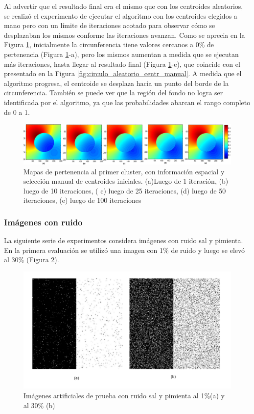 Al advertir que el resultado final era el mismo que con los centroides aleatorios,  se realizó el experimento de ejecutar el algoritmo con los centroides elegidos a mano pero con un límite de iteraciones acotado para observar cómo se desplazaban los mismos conforme las iteraciones avanzan. Como se aprecia en la Figura \ref{fig:circulo_iteraciones}, inicialmente la circunferencia tiene valores cercanos a $0\%$ de pertenencia (Figura \ref{fig:circulo_iteraciones}-a), pero los mismos aumentan a medida que se ejecutan más iteraciones, hasta llegar al resultado final (Figura \ref{fig:circulo_iteraciones}-e), que coincide con el presentado en la Figura \ref{fig:circulo_aleatorio_centr_manual}. A medida que el algoritmo progresa, el centroide se desplaza hacia un punto del borde de la circunferencia. También se puede ver que la región del fondo no logra ser identificada por el algoritmo, ya que las probabilidades abarcan el rango completo de 0 a 1. 

\begin{figure}[H]
\centering
\includegraphics[scale=0.08]{images/circulo_iteraciones_x1.jpg}
\caption{Mapas de pertenencia al primer cluster, con información espacial y selección manual de centroides iniciales. (a)Luego de 1 iteración, (b) luego de 10 iteraciones, ( c) luego de 25 iteraciones, (d) luego de 50 iteraciones, (e) luego de 100 iteraciones}
\label{fig:circulo_iteraciones}
\end{figure}

\subsubsection{Imágenes con ruido}
La siguiente serie de experimentos considera imágenes con ruido sal y pimienta. En la primera evaluación se utilizó una imagen con 1\% de ruido y luego se elevó al 30\% (Figura \ref{fig:mitad_mitad_ruido_1p}).

\begin{figure}[H]
\centering
\includegraphics[scale=0.06]{images/original_mitad_con_ruido_1y30.jpg}
\caption{Imágenes artificiales de prueba con ruido sal y pimienta al 1\%(a) y al 30\% (b)}
\label{fig:mitad_mitad_ruido_1p}
\end{figure}

